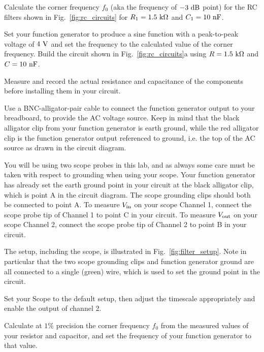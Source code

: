 \begin{measurement} Calculate the corner frequency $f_0$ (aka the frequency of
$-3~\rm dB$ point) for the RC filters shown in
Fig.~\ref{fig:rc_circuits} for $R_1=1.5~\rm k\Omega$ and $C_1=10~\rm nF$.\\
\end{measurement}
\noindent Set your function generator to produce a sine function with a
peak-to-peak voltage of $4~\rm V$ and set the frequency to the calculated value of the corner frequency. %
Build the circuit shown in Fig.~\ref{fig:rc_circuits}a using
$R=1.5~\rm k \Omega$ and $C= 10~\rm nF$.  
\begin{measurement} Measure and record the
actual resistance and capacitance of the components before installing
them in your circuit. 
\end{measurement}
Use a BNC-alligator-pair cable to connect the
function generator output to your breadboard, to provide the AC
voltage source.  Keep in mind that the black alligator clip from your
function generator is earth ground, while the red alligator clip is the
function generator output referenced to ground, i.e. the top of the AC
source as drawn in the circuit diagram.

You will be using two scope probes in this lab, and as always some
care must be taken with respect to grounding when using your scope.
Your function generator has already set the earth ground point in your
circuit at the black alligator clip, which is point A in the circuit
diagram.  The scope grounding clips should both be connected to point
A.  To measure $V_{\rm in}$ on your scope Channel 1, connect the scope
probe tip of Channel 1 to point C in your circuit.  To measure $V_{\rm
  out}$ on your scope Channel 2, connect the scope probe tip of
Channel 2 to point B in your circuit.

The setup, including the scope, is illustrated in
Fig.~\ref{fig:filter_setup}.  Note in particular that the two scope
grounding clips and function generator ground are all connected to a
single (green) wire, which is used to set the ground point in the
circuit.

Set your Scope to the default setup, then adjust the timescale
appropriately and enable the output of channel 2.  
\begin{measurement} Calculate at $1\%$
precision the corner frequency $f_0$ from the measured values of your
resistor and capacitor, and set the frequency of your function
generator to that value. 
\end{measurement}

